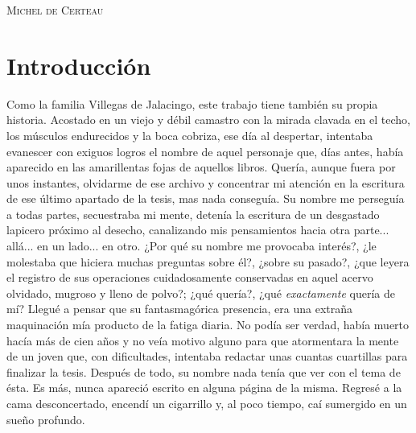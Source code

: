 \documentclass[14pt,twoside,final]{extbook} %
\begin{document}
\begin{flushright}
\textsc{Michel de Certeau}
\end{flushright}
\chapter*{Introducción}
\label{ch:introduccion}
\pagestyle{empty}
\thispagestyle{empty}
\pagestyle{fancy}
\fancyhf{} %
\fancyhead[RO,LE]{\thepage}
\renewcommand{\headrulewidth}{0pt}
Como la familia Villegas de Jalacingo, este trabajo tiene también su propia historia. Acostado en un viejo y débil camastro con la mirada clavada en el techo, los músculos endurecidos y la boca cobriza, ese día al despertar, intentaba evanescer con exiguos logros el nombre de aquel personaje que, días antes, había aparecido en las amarillentas fojas de aquellos libros. Quería, aunque fuera por unos instantes, olvidarme de ese archivo y concentrar mi atención en la escritura de ese último apartado de la tesis, mas nada conseguía. Su nombre me perseguía a todas partes, secuestraba mi mente, detenía la escritura de un desgastado lapicero próximo al desecho, canalizando mis pensamientos hacia otra parte... allá... en un lado... en otro. ¿Por qué su nombre me provocaba interés?, ¿le molestaba que hiciera muchas preguntas sobre él?, ¿sobre su pasado?, ¿que leyera el registro de sus operaciones cuidadosamente conservadas en aquel acervo olvidado, mugroso y lleno de polvo?; ¿qué quería?, ¿qué \emph{exactamente} quería de mí? Llegué a pensar que su fantasmagórica presencia, era una extraña maquinación mía producto de la fatiga diaria. No podía ser verdad, había muerto hacía más de cien años y no veía motivo alguno para que atormentara la mente de un joven que, con dificultades, intentaba redactar unas cuantas cuartillas para finalizar la tesis. Después de todo, su nombre nada tenía que ver con el tema de ésta. Es más, nunca apareció escrito en alguna página de la misma. Regresé a la cama desconcertado, encendí un cigarrillo y, al poco tiempo, caí sumergido en un sueño profundo.
\end{document}
